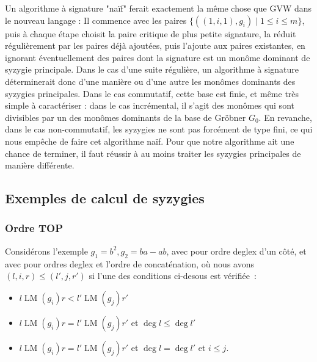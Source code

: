 \documentclass{article}
\DeclareMathOperator{\LM}{LM}
\begin{document}
Un algorithme à signature "naïf" ferait exactement la même chose que GVW dans le nouveau langage :
Il commence avec les paires $\{((1, i, 1), g_i) \;|\; 1 \leq i \leq m\}$, puis à chaque étape choisit la paire critique de plus petite signature, la réduit régulièrement par les paires déjà ajoutées, puis l'ajoute aux paires existantes, en ignorant éventuellement des paires dont la signature est un monôme dominant de syzygie principale.
Dans le cas d'une suite régulière, un algorithme à signature déterminerait donc d'une manière ou d'une autre les monômes dominants des syzygies principales. Dans le cas commutatif, cette base est finie, et même très simple à caractériser : dans le cas incrémental, il s'agit des monômes qui sont divisibles par un des monômes dominants de la base de Gröbner $G_0$.
En revanche, dans le cas non-commutatif, les syzygies ne sont pas forcément de type fini, ce qui nous empêche de faire cet algorithme naïf. Pour que notre algorithme ait une chance de terminer, il faut réussir à au moins traiter les syzygies principales de manière différente.

\subsection*{Exemples de calcul de syzygies}

\subsubsection*{Ordre TOP}

Considérons l'exemple $g_1 = b^2, g_2 = ba - ab$, avec pour ordre deglex d'un côté, et avec pour ordres deglex et l'ordre de concaténation, où
nous avons $(l, i, r) \leq (l', j, r')$ si l'une des conditions ci-desous est vérifiée~:
\begin{itemize}
	\item $l\LM(g_i)r < l'\LM(g_j)r'$
	\item $l\LM(g_i)r = l'\LM(g_j)r'$ et $\deg{l} \leq \deg{l'}$
	\item $l\LM(g_i)r = l'\LM(g_j)r'$ et $\deg{l} = \deg{l'}$ et $i \leq j$.
\end{itemize}
\end{document}
